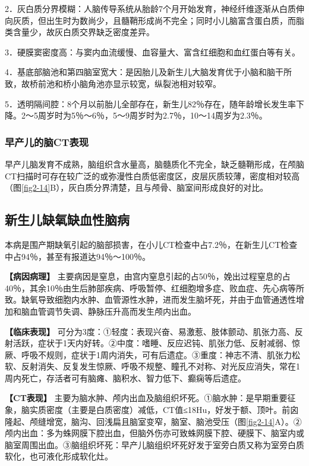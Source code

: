 2．灰白质分界模糊：人脑传导系统从胎龄7个月开始发育，神经纤维逐渐从白质伸向灰质，但出生时为数尚少，且髓鞘形成尚不完全；同时小儿脑富含蛋白质，而脂类含量少，故灰白质交界缺乏密度差异。

3．硬膜窦密度高：与窦内血流缓慢、血容量大、富含红细胞和血红蛋白等有关。

4．基底部脑池和第四脑室宽大：是因胎儿及新生儿大脑发育优于小脑和脑干所致，故桥前池和桥小脑角池亦显示较宽，纵裂池相对较窄。

5．透明隔间腔：8个月以前胎儿全部存在，新生儿82％存在，随年龄增长发生率下降。2～5周岁时为5％～6％，5～9周岁时为2.7％，10～14周岁为2.3％。

\subsubsection{早产儿的脑CT表现}

早产儿脑发育不成熟，脑组织含水量高，脑髓质化不完全，缺乏髓鞘形成，在颅脑CT扫描时可存在较广泛的或弥漫性白质低密度区，皮层灰质较薄，密度相对较高（图\ref{fig2-14}B），灰白质分界清楚，且与颅骨、脑室间形成良好的对比。

\subsection{新生儿缺氧缺血性脑病}

本病是围产期缺氧引起的脑部损害，在小儿CT检查中占7.2％，在新生儿CT检查中占94％，甚至有报道达94％～100％。

\textbf{【病因病理】}
主要病因是窒息，由宫内窒息引起的占50％，娩出过程窒息的占40％，其余10％由生后肺部疾病、呼吸暂停、红细胞增多症、败血症、先心病等所致。缺氧导致细胞内水肿、血管源性水肿，进而发生脑坏死，并由于血管通透性增加和脑血管调节失调、静脉压升高而发生颅内出血。

\textbf{【临床表现】}
可分为3度：①轻度：表现兴奋、易激惹、肢体颤动、肌张力高、反射活跃，症状于1天内好转。②中度：嗜睡、反应迟钝、肌张力低、反射减弱、惊厥、呼吸不规则，症状于1周内消失，可有后遗症。③重度：神志不清、肌张力松软、反射消失、反复发生惊厥、呼吸不规整、瞳孔不对称、对光反应消失，常在1周内死亡，存活者可有脑瘫、脑积水、智力低下、癫痫等后遗症。

\textbf{【CT表现】}
主要为脑水肿、颅内出血及脑组织坏死。①脑水肿：是早期重要征象，脑实质密度（主要是白质密度）减低，CT值≤18Hu，好发于额、顶叶。前囟隆起、颅缝增宽，脑沟、回浅扁且脑室变窄，脑室、脑池受压（图\ref{fig2-14}A）。②颅内出血：多为蛛网膜下腔出血，但脑外伤亦可致蛛网膜下腔、硬膜下、脑室内或脑室周围出血。③脑组织坏死：早产儿脑组织坏死好发于室旁白质又称为室旁白质软化，也可液化形成软化灶。


